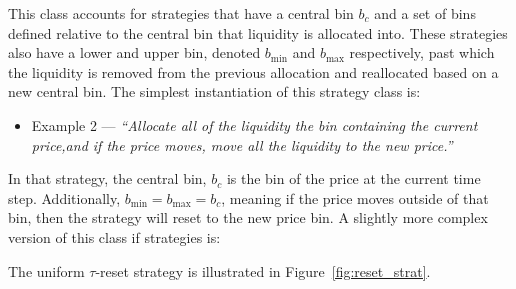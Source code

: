 \documentclass[sigconf, usenames, dvipsnames]{acmart}
\newcommand{\dcp}[1]{\textcolor{blue}{{\scriptsize{David:}}#1}}
\begin{document}


This class accounts for strategies that have a central bin $b_c$ and a set of bins defined relative to the central bin that liquidity is allocated into. These strategies also have a lower and upper bin, denoted $b_{\min}$ and $b_{\max}$ respectively, past which the liquidity is removed from the previous allocation and reallocated based on a new central bin. The simplest instantiation of this strategy class is:
\begin{itemize}
    \item[] Example 2   --- \textit{``Allocate all of the liquidity the bin containing the current price,and if the price moves, move all the liquidity to the new price.''}
\end{itemize}
In that strategy, the central bin, $b_c$ is the bin of the price at the current time step. Additionally, $b_{\min}=b_{\max}=b_c$, meaning if the price moves outside of that bin, then the strategy will reset to the new price bin. A slightly more complex version of this class if strategies is:
\fi



The uniform $\tau$-reset strategy is illustrated in Figure~\ref{fig:reset_strat}.


\end{document}
